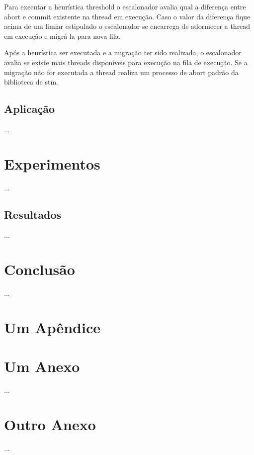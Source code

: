\documentclass[diss,capa]{texufpel}
\begin{document}
Para executar a heurística threshold o escalonador avalia qual a diferença entre abort e commit existente na thread em execução. Caso o valor da diferença fique acima de um limiar estipulado o escalonador se encarrega de adormecer a thread em execução e migrá-la para nova fila.

Após a heurística ser executada e a migração ter sido realizada, o escalonador avalia se existe mais threads disponíveis para execução na fila de execução. Se a migração não for executada a thread realiza um processo de abort padrão da biblioteca de stm.

\section{\textbf{Aplicação}}

...

\chapter{Experimentos}
\label{chapter::experimentos}

...

\section{Resultados}

...

\chapter{Conclusão}
\label{chapter::Conclusão}

...




 

\apendices
\chapter{Um Apêndice}

\anexos
\chapter{Um Anexo}

...

\chapter{Outro Anexo}

...

\end{document}
